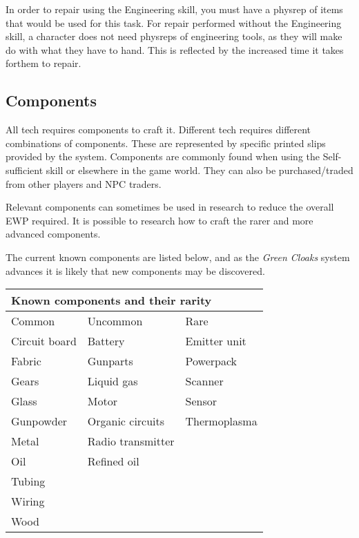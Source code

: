 In order to repair using the Engineering skill, you must have a physrep of items that would be used for this task. For repair performed without the Engineering skill, a character does not need physreps of engineering tools, as they will make do with what they have to hand. This is reflected by the increased time it takes forthem to repair.

\subsection{Components}

All tech requires components to craft it. Different tech requires different combinations of components. These are represented by specific printed slips provided by the system. Components are commonly found when using the Self-sufficient skill or elsewhere in the game world. They can also be purchased/traded from other players and NPC traders.

Relevant components can sometimes be used in research to reduce the overall EWP required. It is possible to research how to craft the rarer and more advanced components.

The current known components are listed below, and as the \textit{Green Cloaks} system advances it is likely that new components may be discovered.

\begin{table}
\begin{tabular}{|l|l|l|} \hline 
\multicolumn{3}{|l|}{Known components and their rarity} \\
 \hline Common & Uncommon & Rare \\
 \hline Circuit board & Battery & Emitter unit \\
 \hline Fabric & Gunparts & Powerpack \\
 \hline Gears & Liquid gas & Scanner \\
 \hline Glass & Motor & Sensor \\
 \hline Gunpowder & Organic circuits & Thermoplasma \\
 \hline Metal & Radio transmitter &  \\
 \hline Oil & Refined oil &  \\
 \hline Tubing &  &  \\
 \hline Wiring &  &  \\
 \hline Wood &  &  \\
 \hline \end{tabular}

\end{table}

